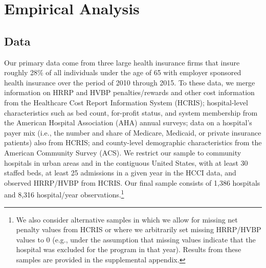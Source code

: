 \documentclass[12pt]{article}
\begin{document}

\section{Empirical Analysis}
\label{sec:Empirical}

\subsection{Data}
Our primary data come from three large health insurance firms that insure roughly 28$\%$ of all individuals under the age of 65 with employer sponsored health insurance over the period of 2010 through 2015.  To these data, we merge information on HRRP and HVBP penalties/rewards and other cost information from the Healthcare Cost Report Information System (HCRIS); hospital-level characteristics such as bed count, for-profit status, and system membership from the American Hospital Association (AHA) annual surveys; data on a hospital's payer mix (i.e., the number and share of Medicare, Medicaid, or private insurance patients) also from HCRIS; and county-level demographic characteristics from the American Community Survey (ACS).  We restrict our sample to community hospitals in urban areas and in the contiguous United States, with at least 30 staffed beds, at least 25 admissions in a given year in the HCCI data, and observed HRRP/HVBP from HCRIS. Our final sample consists of 1,386 hospitals and 8,316 hospital/year observations.\footnote{We also consider alternative samples in which we allow for missing net penalty values from HCRIS or where we arbitrarily set missing HRRP/HVBP values to 0 (e.g., under the assumption that missing values indicate that the hospital was excluded for the program in that year). Results from these samples are provided in the supplemental appendix.}
\end{document}
